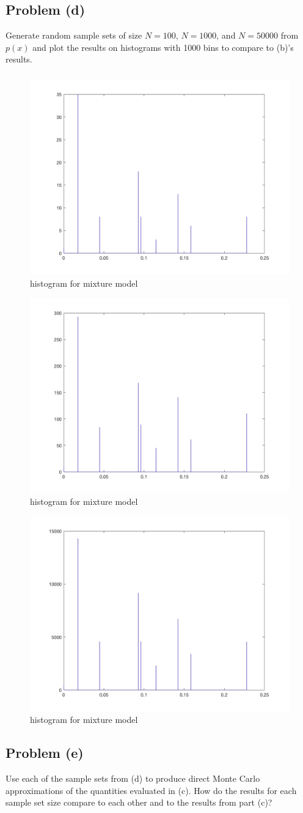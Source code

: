 \documentclass[11pt]{article}
\begin{document}
\subsection*{Problem (d)}
Generate random sample sets of size $N=100$, $N=1000$, and $N=50000$ from $p(x)$ and plot the results on histograms with 1000 bins to compare to (b)'s results.

\subparagraph*{}

\begin{figure}[h!]
	\centering
	\includegraphics[width=0.6\linewidth]{AQ2d_plot1.png}
	\caption{histogram for mixture model}
	\label{AQ2d_plot1}
\end{figure}

\begin{figure}[h!]
	\centering
	\includegraphics[width=0.6\linewidth]{AQ2d_plot2.png}
	\caption{histogram for mixture model}
	\label{AQ2_plot1}
\end{figure}

\begin{figure}[h!]
	\centering
	\includegraphics[width=0.6\linewidth]{AQ2d_plot3.png}
	\caption{histogram for mixture model}
	\label{AQ2d_plot3}
\end{figure}


\subsection*{Problem (e)}
Use each of the sample sets from (d) to produce direct Monte Carlo approximations of the quantities evaluated in (c). How do the results for each sample set size compare to each other and to the results from part (c)?
\end{document}
